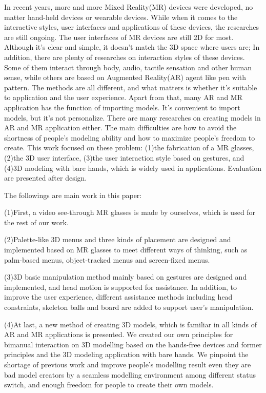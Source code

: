 \begin{englishabstract}

In recent years, more and more Mixed Reality(MR) devices were developed, no matter hand-held devices or wearable devices.
While when it comes to the interactive styles, user interfaces and applications of these devices, the researches are still ongoing.
The user interfaces of MR devices are still 2D for most. Although it's clear and simple, it doesn't match the 3D space where users are;
In addition, there are plenty of researches on interaction styles of these devices. Some of them interact through body, audio, tactile sensation and other human sense, while others are based on Augmented Reality(AR) agent like pen with pattern.
The methods are all different, and what matters is whether it's suitable to application and the user experience.
Apart from that, many AR and MR application has the function of importing models.
It's convenient to import models, but it's not personalize.
There are many researches on creating models in AR and MR application either.
The main difficulties are how to avoid the shortness of people's modeling ability and how to maximize people's freedom to create.
This work focused on these problem:
(1)the fabrication of a MR glasses,
(2)the 3D user interface,
(3)the user interaction style based on gestures,
and (4)3D modeling with bare hands, which is widely used in applications.
Evaluation are presented after design.

The followings are main work in this paper:

(1)First, a video see-through MR glasses is made by ourselves, which is used for the rest of our work.

(2)Palette-like 3D menus and three kinds of placement are designed and implemented based on MR glasses to meet different ways of thinking, such as palm-based menus, object-tracked menus and screen-fixed menus.

(3)3D basic manipulation method mainly based on gestures are designed and implemented, and head motion is supported for assistance.
In addition, to improve the user experience, different assistance methods including head constraints, skeleton balls and board are added to support user's manipulation.

(4)At last, a new method of creating 3D models, which is familiar in all kinds of AR and MR applications is presented.
We created our own principles for bimanual interaction on 3D modelling based on the hands-free devices and former principles
and the 3D modeling application with bare hands.
We pinpoint the shortage of previous work and improve people's modelling result even they are bad model creators by a seamless modelling environment among different status switch, and enough freedom for people to create their own models. 


\end{englishabstract}
